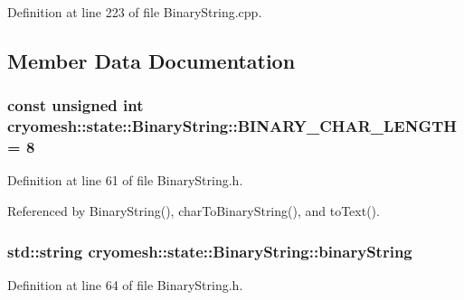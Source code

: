 \-Definition at line 223 of file \-Binary\-String.\-cpp.



\subsection{\-Member \-Data \-Documentation}
\hypertarget{classcryomesh_1_1state_1_1BinaryString_aa4d7d35e5b93d290dfe6f1bafa0e0cc2}{
\subsubsection[{\-B\-I\-N\-A\-R\-Y\-\_\-\-C\-H\-A\-R\-\_\-\-L\-E\-N\-G\-T\-H}]{\setlength{\rightskip}{0pt plus 5cm}const unsigned int {\bf cryomesh\-::state\-::\-Binary\-String\-::\-B\-I\-N\-A\-R\-Y\-\_\-\-C\-H\-A\-R\-\_\-\-L\-E\-N\-G\-T\-H} = 8}}\label{classcryomesh_1_1state_1_1BinaryString_aa4d7d35e5b93d290dfe6f1bafa0e0cc2}


\-Definition at line 61 of file \-Binary\-String.\-h.



\-Referenced by \-Binary\-String(), char\-To\-Binary\-String(), and to\-Text().

\hypertarget{classcryomesh_1_1state_1_1BinaryString_ad125f434a2cb9693597aa8be05217d21}{
\subsubsection[{binary\-String}]{\setlength{\rightskip}{0pt plus 5cm}std\-::string {\bf cryomesh\-::state\-::\-Binary\-String\-::binary\-String}}}\label{classcryomesh_1_1state_1_1BinaryString_ad125f434a2cb9693597aa8be05217d21}


\-Definition at line 64 of file \-Binary\-String.\-h.



